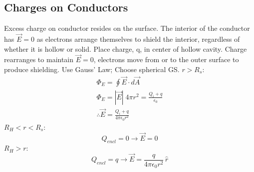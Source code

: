\documentclass[a4paper, 11pt, normalem]{report}
\begin{document}
\section{Charges on Conductors}
Excess charge on conductor resides on the surface.
The interior of the conductor has $\vec{E} = 0$ as electrons arrange themselves to shield the interior, regardless of whether it is hollow or solid.
Place charge, q, in center of hollow cavity.
Charge rearranges to maintain $\vec{E} = 0$, electrons move from or to the outer surface to produce shielding.
Use Gauss' Law; Choose spherical GS.
$r > R_{s}$:
\begin{align}
    \Phi_{E} = \oint \vec{E} \cdot d\vec{A} \\
    \Phi_{E} = |\vec{E}| \; 4\pi r^{2}= \frac{Q_{i} + q}{\epsilon_{0}} \\
    \therefore \vec{E} = \frac{Q_{i} + q}{4\pi \epsilon_{0} r^{2} }
\end{align}
$R_{H} < r < R_{s}$:
\begin{equation}
    Q_{encl} = 0 \to \vec{E} = 0
\end{equation}
$R_{H} > r$:
\begin{equation}
    Q_{encl} = q \to \vec{E} = \frac{q}{4\pi \epsilon_{0} r^{2}} \, \hat{r}
\end{equation}

\chapter{}
\end{document}
